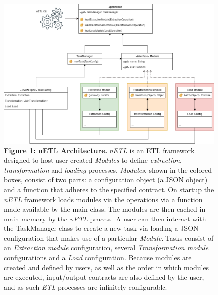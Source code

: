 \begin{figure}[H]
    \centering
    \begin{mdframed}
        \centering
        \includegraphics[scale=0.39]{./resources/figures/netl.png}
    \end{mdframed}
    \caption[nETL Architecture]{\textbf{Figure \ref{nETL}: nETL Architecture.} \textit{nETL} is an ETL framework designed to host user-created \textit{Modules} to define \textit{extraction}, \textit{transformation} and \textit{loading} processes. \textit{Modules}, shown in the colored boxes, consist of two parts: a configuration object (a JSON object) and a function that adheres to the specified contract. On startup the \textit{nETL} framework loads modules via the operations via a function made available by the main class. The modules are then cached in main memory by the \textit{nETL} process. A user can then interact with the TaskManager class to create a new task via loading a JSON configuration that makes use of a particular \textit{Module}. Tasks consist of an \textit{Extraction module} configuration, several \textit{Transformation module} configurations and a \textit{Load} configuration. Because modules are created and defined by users, as well as the order in which modules are executed, input/output contracts are also defined by the user, and as such \textit{ETL} processes are infinitely configurable.}
    \label{nETL}
\end{figure}